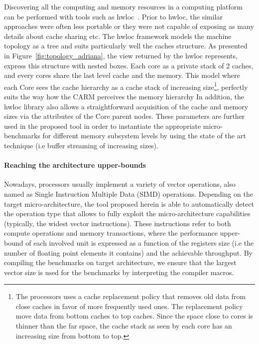 \documentclass[twoside,twocolumn,8pt]{extarticle}
\begin{document}
Discovering all the computing and memory resources in a computing platform can be performed with tools such as
hwloc~\cite{goglin:hal-01330194}. Prior to hwloc,  the similar approaches were often less portable or they were not capable of
exposing as many details about cache sharing etc. The hwloc framework models the machine topology as a tree and suits particularly
well the caches structure.
As presented in Figure~\ref{fig:topology_adriana}, the view returned by the hwloc represents, express this structure with nested
boxes. Each core as a private stack of 2 caches, and every cores share the last level cache and the memory. This model where each
Core sees  the cache hierarchy as a cache stack of increasing size\footnote{
  The processors uses a cache replacement policy that removes old data from
  close caches in favor of more frequently used ones. The replacement policy move data from bottom caches to top caches. Since the
  space close to cores is thinner than the far space, the cache stack as seen by each core has an increasing size from bottom to
  top.
}, perfectly suits the way how the CARM perceives the memory hierarchy 
In addition, the hwloc library also allows a straightforward acquisition  of the cache and memory sizes via the  attributes of the
Core parent nodes. These parameters are further used in the proposed tool  in order to instantiate the appropriate micro-benchmarks
for different memory subsystem levels by using the state of the art technique (i.e buffer streaming of increasing sizes).

\paragraph*{Reaching the architecture upper-bounds}

Nowadays, processors usually implement a variety of vector operations, also named as Single Instruction Multiple Data (SIMD)
operations. Depending on the target micro-architecture,  the tool proposed herein is able to automatically detect the operation
type that allows to fully exploit the micro-architecture capabilities  (typically, the widest vector instructions). These
instructions refer to both compute operations and memory transactions, where the performance upper-bound of each involved unit is
expressed as a function of the registers size (i.e the number of floating point  elements it contains) and the achievable
throughput. By compiling the benchmarks on target architecture, we ensure that the largest vector size is used for the benchmarks
by interpreting the compiler macros. 
\end{document}
